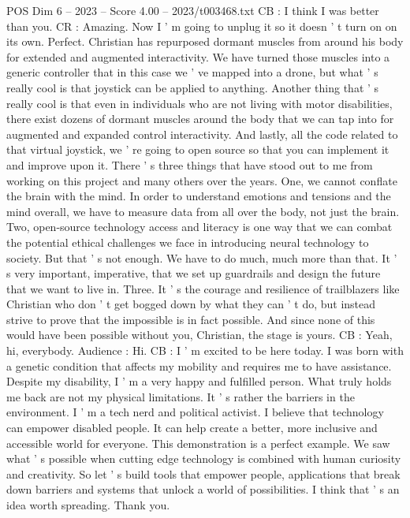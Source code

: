\begin{textsample}{POS Dim 6 – 2023 – Score 4.00 – 2023/t003468.txt}
CB : I think I was better than you.
CR : Amazing.
Now I ' m going to unplug it so it doesn ' t turn on on its own.
Perfect.
Christian has repurposed dormant muscles from around his body for extended and augmented interactivity.
We have turned those muscles into a generic controller that in this case we ' ve mapped into a drone, but what ' s really cool is that joystick can be applied to anything.
Another thing that ' s really cool is that even in individuals who are not living with motor disabilities, there exist dozens of dormant muscles around the body that we can tap into for augmented and expanded control interactivity.
And lastly, all the code related to that virtual joystick, we ' re going to open source so that you can implement it and improve upon it.
There ' s three things that have stood out to me from working on this project and many others over the years.
One, we cannot conflate the brain with the mind.
In order to understand emotions and tensions and the mind overall, we have to measure data from all over the body, not just the brain.
Two, open-source technology access and literacy is one way that we can combat the potential ethical challenges we face in introducing neural technology to society.
But that ' s not enough.
We have to do much, much more than that.
It ' s very important, imperative, that we set up guardrails and design the future that we want to live in.
Three.
It ' s the courage and resilience of trailblazers like Christian who don ' t get bogged down by what they can ' t do, but instead strive to prove that the impossible is in fact possible.
And since none of this would have been possible without you, Christian, the stage is yours.
CB : Yeah, hi, everybody.
Audience : Hi.
CB : I ' m excited to be here today.
I was born with a genetic condition that affects my mobility and requires me to have assistance.
Despite my disability, I ' m a very happy and fulfilled person.
What truly holds me back are not my physical limitations.
It ' s rather the barriers in the environment.
I ' m a tech nerd and political activist.
I believe that technology can empower disabled people.
It can help create a better, more inclusive and accessible world for everyone.
This demonstration is a perfect example.
We saw what ' s possible when cutting edge technology is combined with human curiosity and creativity.
So let ' s build tools that empower people, applications that break down barriers and systems that unlock a world of possibilities.
I think that ' s an idea worth spreading.
Thank you.

\end{textsample}
